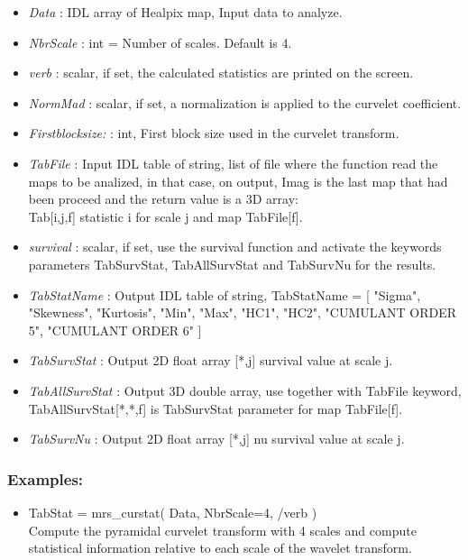 \begin{itemize}
\item {\em Data} : IDL array of Healpix map, Input data to analyze. 
\item {\em NbrScale} : int = Number of scales. Default is 4.  
\item {\em verb} : scalar, if set, the calculated statistics are printed on the screen.
\item {\em NormMad} : scalar, if set, a normalization is applied to the curvelet coefficient.
\item {\em Firstblocksize:} : int, First block size used in the curvelet transform.
\item {\em TabFile} : Input IDL table of string, list of file where the function read the maps to be analized, in that case, on output, 
Imag is the last map that had been proceed and the return value is a 3D array:\\
Tab[i,j,f] \qquad statistic i for scale j and map TabFile[f].
\item {\em survival} : scalar, if set, use the survival function and activate the keywords parameters 
TabSurvStat, TabAllSurvStat and TabSurvNu for the results.
\item {\em TabStatName} : Output IDL table of string, TabStatName = [ "Sigma", "Skewness", "Kurtosis", "Min", "Max", "HC1", "HC2", "CUMULANT ORDER 5", "CUMULANT ORDER 6" ]
\item {\em TabSurvStat} : Output 2D float array [*,j] survival value at scale j.
\item {\em TabAllSurvStat} : Output 3D double array, use together with TabFile keyword, TabAllSurvStat[*,*,f] is TabSurvStat parameter for map TabFile[f].
\item {\em TabSurvNu} : Output 2D float array [*,j] nu survival value at scale j.
\end{itemize}

\subsubsection*{Examples:} 
\begin{itemize}
\item TabStat = mrs\_curstat( Data, NbrScale=4, /verb ) \\
Compute the pyramidal curvelet transform with 4 scales and compute statistical information relative to each scale of the wavelet transform.
\end{itemize}



